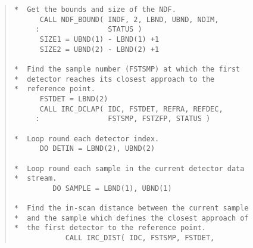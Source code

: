 \begin{quote}
\begin{tabbing} 

\verb#*  Get the bounds and size of the NDF.                 #\\
\verb#      CALL NDF_BOUND( INDF, 2, LBND, UBND, NDIM,       #\\
\verb#     :                STATUS )                         #\\
\verb#      SIZE1 = UBND(1) - LBND(1) +1                     #\\
\verb#      SIZE2 = UBND(2) - LBND(2) +1                     #\\
\verb#                                                       #\\
\verb#*  Find the sample number (FSTSMP) at which the first  #\\
\verb#*  detector reaches its closest approach to the        #\\
\verb#*  reference point.                                    #\\
\verb#      FSTDET = LBND(2)                                 #\\
\verb#      CALL IRC_DCLAP( IDC, FSTDET, REFRA, REFDEC,      #\\
\verb#     :                FSTSMP, FSTZFP, STATUS )         #\\
\verb#                                                       #\\
\verb#*  Loop round each detector index.                     #\\
\verb#      DO DETIN = LBND(2), UBND(2)                      #\\
\verb#                                                       #\\
\verb#*  Loop round each sample in the current detector data #\\
\verb#*  stream.                                             #\\
\verb#         DO SAMPLE = LBND(1), UBND(1)                  #\\
\verb#                                                       #\\
\verb#*  Find the in-scan distance between the current sample#\\
\verb#*  and the sample which defines the closest approach of#\\
\verb#*  the first detector to the reference point.          #\\
\verb#            CALL IRC_DIST( IDC, FSTSMP, FSTDET,        #\\

\end{tabbing}
\end{quote}
